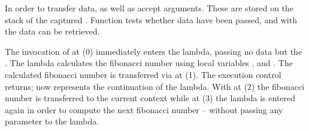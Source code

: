 In order to transfer data, \call as well as \op accept arguments. These are
stored on the stack of the captured \currcont. Function \davail tests whether data
have been passed, and with \dget the data can be retrieved.

The invocation of \call at (0) immediately enters the lambda, passing no data
but the \currcont. The lambda calculates the fibonacci number using local
variables ,  and . The calculated fibonacci number is
transferred via \op at (1). The execution control returns;  now
represents the continuation of the lambda. With \dget at (2) the fibonacci
number is transferred to the current context while at (3) the lambda is entered
again in order to compute the next fibonacci number -- without passing any
parameter to the lambda.
